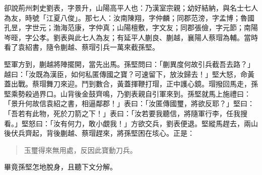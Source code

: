 卻說荊州刺史劉表，字景升，山陽高平人也：乃漢室宗親；幼好結納，與名士七人為友，時號「江夏八俊」。那七人：汝南陳翔，字仲麟；同郡范滂，字孟博；魯國孔昱，字世元；渤海范康，字仲真；山陽檀敷，字文友；同郡張儉，字元節；南陽岑晊，字公孝。劉表與此七人為友；有延平人蒯良、蒯越，襄陽人蔡瑁為輔。當時看了袁紹書，隨令蒯越、蔡瑁引兵一萬來截孫堅。

堅軍方到，蒯越將陣擺開，當先出馬。孫堅問曰：「蒯異度何故引兵截吾去路？」越曰：「汝既為漢臣，如何私匿傳國之寶？可速留下，放汝歸去！」堅大怒，命黃蓋出戰。蔡瑁舞刀來迎。鬥到數合，黃蓋揮鞭打瑁，正中護心鏡。瑁撥回馬走，孫堅乘勢殺過界口。山背後金鼓齊鳴，乃劉表親自引軍來到。孫堅就馬上施禮曰：「景升何故信袁紹之書，相逼鄰郡！」表曰：「汝匿傳國璽，將欲反耶？」堅曰：「吾若有此物，死於刀箭之下！」表曰：「汝若要我聽信，將隨軍行李，任我搜看。」堅怒曰：「汝有何力，敢小覷我！」方欲交兵，劉表便退。堅縱馬趕去，兩山後伏兵齊起，背後蒯越、蔡瑁趕來，將孫堅困在垓心。正是：

\begin{quote}
玉璽得來無用處，反因此寶動刀兵。
\end{quote}

畢竟孫堅怎地脫身，且聽下文分解。
